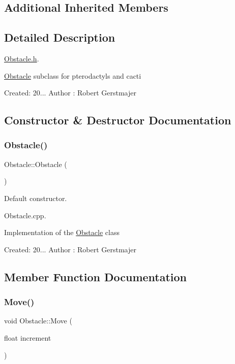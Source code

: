 \subsection*{Additional Inherited Members}


\subsection{Detailed Description}
\mbox{\hyperlink{_obstacle_8h_source}{Obstacle.\+h}}. 

\mbox{\hyperlink{class_obstacle}{Obstacle}} subclass for pterodactyls and cacti

Created\+: 20... Author \+: Robert Gerstmajer 

\subsection{Constructor \& Destructor Documentation}
\mbox{\label{class_obstacle_a8f734072321fa06a7b7dae2d5f50f352}} 
\subsubsection{\texorpdfstring{Obstacle()}{Obstacle()}}
{\footnotesize\ttfamily Obstacle\+::\+Obstacle (\begin{DoxyParamCaption}{ }\end{DoxyParamCaption})}



Default constructor. 

Obstacle.\+cpp.

Implementation of the \mbox{\hyperlink{class_obstacle}{Obstacle}} class

Created\+: 20... Author \+: Robert Gerstmajer 

\subsection{Member Function Documentation}
\mbox{\label{class_obstacle_af06377faeba537b4ff98ee2cfa061831}} 
\subsubsection{\texorpdfstring{Move()}{Move()}}
{\footnotesize\ttfamily void Obstacle\+::\+Move (\begin{DoxyParamCaption}\item[{float}]{increment }\end{DoxyParamCaption})}



